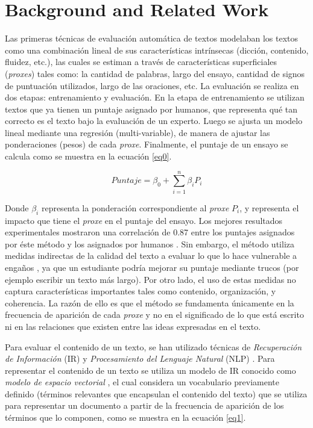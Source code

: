 \documentclass[12pt]{diicc}
\begin{document}
\chapter{Background and Related Work}\label{chap:background}

Las primeras técnicas de evaluación automática de textos \cite{t0} modelaban los textos como una combinación lineal de sus características intrínsecas (dicción, contenido, fluidez, etc.), las cuales se estiman a través de características superficiales ({\em proxes}) tales como: la cantidad de palabras, largo del ensayo, cantidad de signos de puntuación utilizados, largo de las oraciones, etc. La evaluación se realiza en dos etapas: entrenamiento y evaluación. En la etapa de entrenamiento se utilizan textos que ya tienen un puntaje asignado por humanos, que representa qué tan correcto es el texto bajo la evaluación de un experto. Luego se ajusta un modelo lineal mediante una regresión (multi-variable), de manera de ajustar las ponderaciones (pesos) de cada {\em proxe}. Finalmente, el puntaje de un ensayo se calcula como se muestra en la ecuación \ref{eq0}.

\begin{equation}
	\label{eq0}
	Puntaje = \beta_0 + \sum\limits_{i=1}^n \beta_iP_i
\end{equation}

Donde $\beta_i$ representa la ponderación correspondiente al {\em proxe} $P_i$, y representa el impacto que tiene el {\em proxe} en el puntaje del ensayo. Los mejores resultados experimentales mostraron una correlación de 0.87 entre los puntajes asignados por éste método y los asignados por humanos \cite{t0}. Sin embargo, el método utiliza medidas indirectas de la calidad del texto a evaluar lo que lo hace vulnerable a engaños \cite{t9}, ya que un estudiante podría mejorar su puntaje mediante trucos (por ejemplo escribir un texto más largo). Por otro lado, el uso de estas medidas no captura características importantes tales como contenido, organización, y coherencia. La razón de ello es que el método se fundamenta únicamente en la frecuencia de aparición de cada {\em proxe} y no en el significado de lo que está escrito ni en las relaciones que existen entre las ideas expresadas en el texto.

Para evaluar el contenido de un texto, se han utilizado técnicas de {\em Recuperación de Información} (IR) \cite{t26} y {\em Procesamiento del Lenguaje Natural} (NLP) \cite{t27}. Para representar el contenido de un texto se utiliza un modelo de IR conocido como {\em modelo de espacio vectorial} \cite{t26}, el cual considera un vocabulario previamente definido (términos relevantes que encapsulan el contenido del texto) que se utiliza para representar un documento a partir de la frecuencia de aparición de los términos que lo componen, como se muestra en la ecuación \ref{eq1}.
\end{document}
